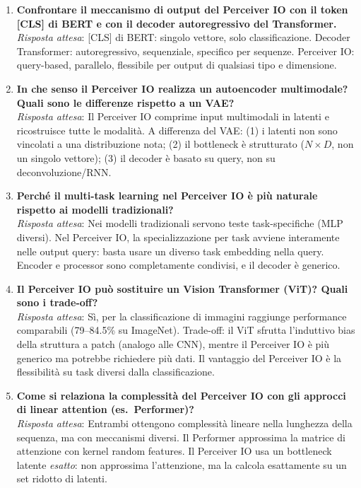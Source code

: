 \documentclass[12pt,a4paper]{article}
\begin{document}
\begin{enumerate}[label=\textbf{Q\arabic*.}, resume]
    \item \textbf{Confrontare il meccanismo di output del Perceiver IO con il token [CLS] di BERT e con il decoder autoregressivo del Transformer.}\\
    \textit{Risposta attesa}: [CLS] di BERT: singolo vettore, solo classificazione. Decoder Transformer: autoregressivo, sequenziale, specifico per sequenze. Perceiver IO: query-based, parallelo, flessibile per output di qualsiasi tipo e dimensione.

    \item \textbf{In che senso il Perceiver IO realizza un autoencoder multimodale? Quali sono le differenze rispetto a un VAE?}\\
    \textit{Risposta attesa}: Il Perceiver IO comprime input multimodali in latenti e ricostruisce tutte le modalit\`a. A differenza del VAE: (1) i latenti non sono vincolati a una distribuzione nota; (2) il bottleneck \`e strutturato ($N \times D$, non un singolo vettore); (3) il decoder \`e basato su query, non su deconvoluzione/RNN.

    \item \textbf{Perch\'e il multi-task learning nel Perceiver IO \`e pi\`u naturale rispetto ai modelli tradizionali?}\\
    \textit{Risposta attesa}: Nei modelli tradizionali servono teste task-specifiche (MLP diversi). Nel Perceiver IO, la specializzazione per task avviene interamente nelle output query: basta usare un diverso task embedding nella query. Encoder e processor sono completamente condivisi, e il decoder \`e generico.

    \item \textbf{Il Perceiver IO pu\`o sostituire un Vision Transformer (ViT)? Quali sono i trade-off?}\\
    \textit{Risposta attesa}: S\`i, per la classificazione di immagini raggiunge performance comparabili (79--84.5\% su ImageNet). Trade-off: il ViT sfrutta l'induttivo bias della struttura a patch (analogo alle CNN), mentre il Perceiver IO \`e pi\`u generico ma potrebbe richiedere pi\`u dati. Il vantaggio del Perceiver IO \`e la flessibilit\`a su task diversi dalla classificazione.

    \item \textbf{Come si relaziona la complessit\`a del Perceiver IO con gli approcci di linear attention (es.\ Performer)?}\\
    \textit{Risposta attesa}: Entrambi ottengono complessit\`a lineare nella lunghezza della sequenza, ma con meccanismi diversi. Il Performer approssima la matrice di attenzione con kernel random features. Il Perceiver IO usa un bottleneck latente \emph{esatto}: non approssima l'attenzione, ma la calcola esattamente su un set ridotto di latenti.


\end{enumerate}
\end{document}

